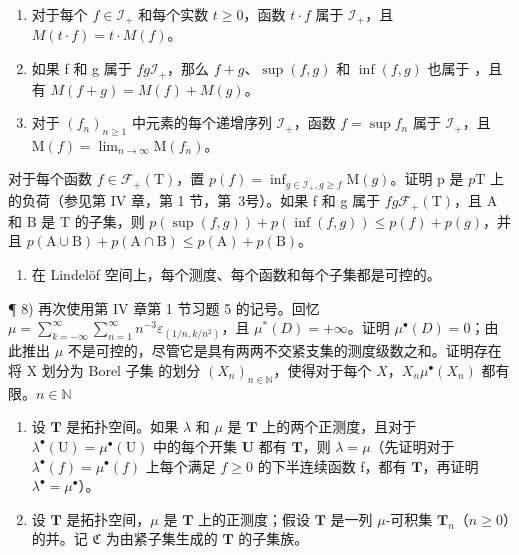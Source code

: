 \begin{enumerate}
\def\labelenumi{\alph{enumi})}
\item
  对于每个 \(f \in \mathcal{I}_+\) 和每个实数 \(t \geqslant 0\)，函数 \(t \cdot f\) 属于 \(\mathcal{I}_+\)，且 \(M(t \cdot f) = t \cdot M(f)\)。
\item
  如果 f 和 g 属于 \(f\)\(g\)\(\mathcal{I}_+\)，那么 \(f + g\)、\(\sup(f, g)\) 和 \(\inf(f, g)\) 也属于 ，且有 \(M(f + g) = M(f) + M(g)\)。
\item
  对于 \((f_n)_{n\geqslant 1}\) 中元素的每个递增序列 \(\mathcal{I}_+\)，函数 \(f = \sup f_n\) 属于 \(\mathcal{I}_+\)，且 \(\mathrm{M}(f) = \lim_{n\to \infty}\mathrm{M}(f_n)\)。
\end{enumerate}

对于每个函数 \(f \in \mathcal{F}_{+}(\mathrm{T})\)，置 \(p(f) = \inf_{g \in \mathcal{I}_{+}, g \geqslant f} \mathrm{M}(g)\)。证明 p 是 \(p\)\(\mathrm{T}\) 上的负荷（参见第 IV 章，第 1 节，第~3号）。如果 f 和 g 属于 \(f\)\(g\)\(\mathcal{F}_{+}(\mathrm{T})\)，且 \(\mathrm{A}\) 和 \(\mathrm{B}\) 是 \(\mathrm{T}\) 的子集，则 \(p(\sup(f, g)) + p(\inf(f, g)) \leqslant p(f) + p(g)\)，并且 \(p(\mathrm{A} \cup \mathrm{B}) + p(\mathrm{A} \cap \mathrm{B}) \leqslant p(\mathrm{A}) + p(\mathrm{B})\)。

\begin{enumerate}
\def\labelenumi{\arabic{enumi})}
\setcounter{enumi}{6}
\tightlist
\item
  在 Lindelöf 空间上，每个测度、每个函数和每个子集都是可控的。
\end{enumerate}

¶ 8) 再次使用第 IV 章第 1 节习题 5 的记号。回忆 \(\mu = \sum_{k=-\infty}^{\infty} \sum_{n=1}^{\infty} n^{-3} \varepsilon_{(1/n,k/n^2)}\)，且 \(\mu^{*}(D) = +\infty\)。证明 \(\mu^{\bullet}(D) = 0\)；由此推出 \(\mu\) 不是可控的，尽管它是具有两两不交紧支集的测度级数之和。证明存在将 X 划分为 Borel 子集  的划分 \((X_n)_{n \in \mathbb{N}}\)，使得对于每个 \(X\)，\(X_n\)\(\mu^{\bullet}(X_n)\) 都有限。\(n \in \mathbb{N}\)

\begin{enumerate}
\def\labelenumi{\arabic{enumi})}
\setcounter{enumi}{8}
\item
  设 \(\mathbf{T}\) 是拓扑空间。如果 \(\lambda\) 和 \(\mu\) 是 \(\mathbf{T}\) 上的两个正测度，且对于 \(\lambda^{\bullet}(\mathrm{U}) = \mu^{\bullet}(\mathrm{U})\) 中的每个开集 \(\mathbf{U}\) 都有 \(\mathbf{T}\)，则 \(\lambda = \mu\)（先证明对于 \(\lambda^{\bullet}(f) = \mu^{\bullet}(f)\) 上每个满足 \(f \geqslant 0\) 的下半连续函数 f，都有 \(\mathbf{T}\)，再证明 \(\lambda^{\bullet} = \mu^{\bullet}\)）。
\item
  设 \(\mathbf{T}\) 是拓扑空间，\(\mu\) 是 \(\mathbf{T}\) 上的正测度；假设 \(\mathbf{T}\) 是一列 \(\mu\)-可积集 \(\mathbf{T}_n\)（\(n \geqslant 0\)）的并。记 \(\mathfrak{C}\) 为由紧子集生成的 \(\mathbf{T}\) 的子集族。
\end{enumerate}

